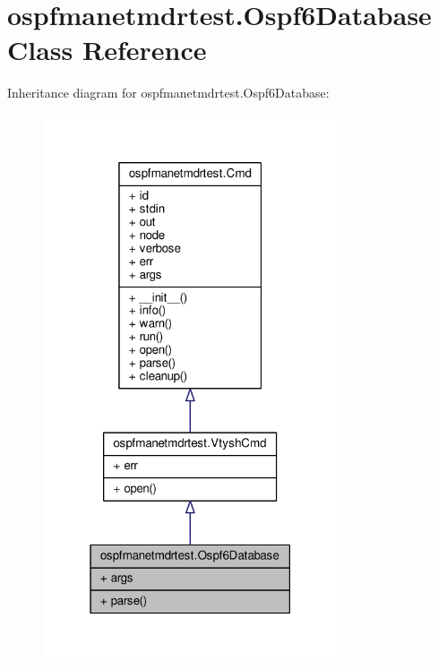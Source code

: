 \hypertarget{classospfmanetmdrtest_1_1_ospf6_database}{\section{ospfmanetmdrtest.\+Ospf6\+Database Class Reference}
\label{classospfmanetmdrtest_1_1_ospf6_database}
}


Inheritance diagram for ospfmanetmdrtest.\+Ospf6\+Database\+:
\nopagebreak
\begin{figure}[H]
\begin{center}
\leavevmode
\includegraphics[width=247pt]{classospfmanetmdrtest_1_1_ospf6_database__inherit__graph}
\end{center}
\end{figure}


